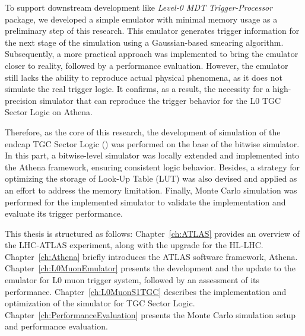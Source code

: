 To support downstream development like \textit{Level-0 MDT Trigger-Processor} package, we developed a simple emulator with minimal memory usage as a preliminary step of this research. This emulator generates trigger information for the next stage of the simulation using a Gaussian-based smearing algorithm. Subsequently, a more practical approach was implemented to bring the emulator closer to reality, followed by a performance evaluation. However, the emulator still lacks the ability to reproduce actual physical phenomena, as it does not simulate the real trigger logic. It confirms, as a result, the necessity for a high-precision simulator that can reproduce the trigger behavior for the L0 TGC Sector Logic on Athena.

Therefore, as the core of this research, the development of simulation of the endcap TGC Sector Logic (\SL) was performed on the base of the bitwise simulator. In this part, a bitwise-level simulator was locally extended and implemented into the Athena framework, ensuring consistent logic behavior. Besides, a strategy for optimizing the storage of Look-Up Table (LUT) was also devised and applied as an effort to address the memory limitation. Finally, Monte Carlo simulation was performed for the implemented simulator to validate the implementation and evaluate its trigger performance.

This thesis is structured as follows: Chapter~\ref{ch:ATLAS} provides an overview of the LHC-ATLAS experiment, along with the upgrade for the HL-LHC. Chapter~\ref{ch:Athena} briefly introduces the ATLAS software framework, Athena. Chapter~\ref{ch:L0MuonEmulator} presents the development and the update to the emulator for L0 muon trigger system, followed by an assessment of its performance. Chapter~\ref{ch:L0MuonS1TGC} describes the implementation and optimization of the simulator for TGC Sector Logic. Chapter~\ref{ch:PerformanceEvaluation} presents the Monte Carlo simulation setup and performance evaluation.